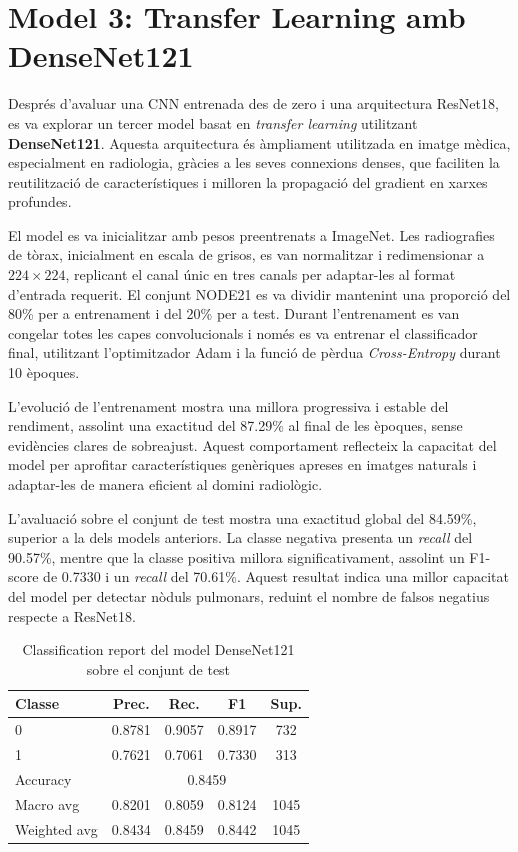 \documentclass[conference]{IEEEtran}
\begin{document}
\section{Model 3: Transfer Learning amb DenseNet121}

Després d’avaluar una CNN entrenada des de zero i una arquitectura ResNet18, es va
explorar un tercer model basat en \textit{transfer learning} utilitzant
\textbf{DenseNet121}. Aquesta arquitectura és àmpliament utilitzada en imatge
mèdica, especialment en radiologia, gràcies a les seves connexions denses, que
faciliten la reutilització de característiques i milloren la propagació del
gradient en xarxes profundes.

El model es va inicialitzar amb pesos preentrenats a ImageNet. Les radiografies de
tòrax, inicialment en escala de grisos, es van normalitzar i redimensionar a
$224 \times 224$, replicant el canal únic en tres canals per adaptar-les al format
d’entrada requerit. El conjunt NODE21 es va dividir mantenint una proporció del
80\% per a entrenament i del 20\% per a test. Durant l’entrenament es van congelar
totes les capes convolucionals i només es va entrenar el classificador final, utilitzant
l’optimitzador Adam i la funció de pèrdua \textit{Cross-Entropy} durant 10 èpoques.

L’evolució de l’entrenament mostra una millora progressiva i estable del rendiment,
assolint una exactitud del 87.29\% al final de les èpoques, sense evidències clares
de sobreajust. Aquest comportament reflecteix la capacitat del model per aprofitar
característiques genèriques apreses en imatges naturals i adaptar-les de manera
eficient al domini radiològic.

L’avaluació sobre el conjunt de test mostra una exactitud global del 84.59\%,
superior a la dels models anteriors. La classe negativa presenta un \textit{recall}
del 90.57\%, mentre que la classe positiva millora significativament, assolint un
F1-score de 0.7330 i un \textit{recall} del 70.61\%. Aquest resultat indica una
millor capacitat del model per detectar nòduls pulmonars, reduint el nombre de
falsos negatius respecte a ResNet18.

\begin{table}[H]
\caption{Classification report del model DenseNet121 sobre el conjunt de test}
\label{tab:classification_report_densenet}
\centering
\footnotesize
\setlength{\tabcolsep}{3pt}
\begin{tabular}{lcccc}
\toprule
\textbf{Classe} & \textbf{Prec.} & \textbf{Rec.} & \textbf{F1} & \textbf{Sup.} \\
\midrule
0 & 0.8781 & 0.9057 & 0.8917 & 732 \\
1 & 0.7621 & 0.7061 & 0.7330 & 313 \\
\midrule
Accuracy     & \multicolumn{4}{c}{0.8459} \\
Macro avg    & 0.8201 & 0.8059 & 0.8124 & 1045 \\
Weighted avg & 0.8434 & 0.8459 & 0.8442 & 1045 \\
\bottomrule
\end{tabular}
\end{table}
\end{document}
